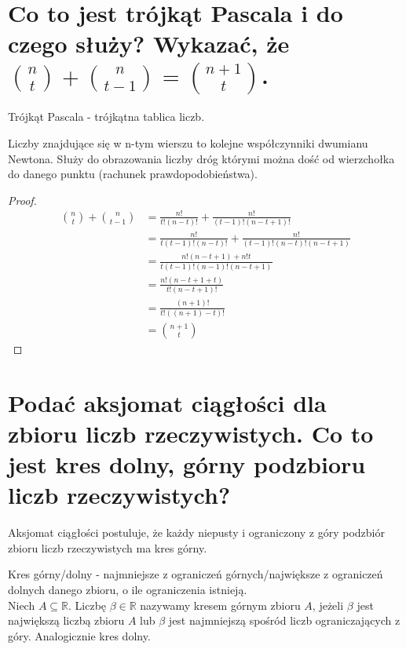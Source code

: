 \documentclass{article}
\numberwithin{equation}{section}
\theoremstyle{definition}
\theoremstyle{case}
\newcommand*{\R}{\mathbb{R}}
\begin{document}
\section{Co to jest trójkąt Pascala i do czego służy? Wykazać, że
	\texorpdfstring
	{${\binom{n}{t}+\binom{n}{t-1}=\binom{n+1}{t}}$.}
	{(n t)+(n t-1)=(n+1 t).}
}
\begin{multicols}{2}
	\raggedcolumns
	Trójkąt Pascala - trójkątna tablica liczb.

	Liczby znajdujące się w n-tym wierszu to kolejne współczynniki dwumianu Newtona. Służy do obrazowania liczby dróg którymi można dość od wierzchołka do danego punktu (rachunek prawdopodobieństwa).

	\centering
\end{multicols}
\begin{proof}
	\begin{align*}
		\binom{n}{t}+\binom{n}{t-1}
		&= \frac{n!}{t!(n-t)!}+\frac{n!}{(t-1)!(n-t+1)!}
		\\ &= \frac{n!}{t(t-1)!(n-t)!}+\frac{n!}{(t-1)!(n-t)!(n-t+1)}
		\\ &= \frac{n!(n-t+1)+n!t}{t(t-1)!(n-1)!(n-t+1)}
		\\ &= \frac{n!(n-t+1+t)}{t!(n-t+1)!}
		\\ &= \frac{(n+1)!}{t!((n+1)-t)!}
		\\ &= \binom{n+1}{t}
	\end{align*}
\end{proof}

\section{Podać aksjomat ciągłości dla zbioru liczb rzeczywistych. Co to jest kres dolny, górny podzbioru liczb rzeczywistych?}
Aksjomat ciągłości postuluje, że każdy niepusty i ograniczony z góry podzbiór zbioru liczb rzeczywistych ma kres górny.

Kres górny/dolny - najmniejsze z ograniczeń górnych/największe z ograniczeń dolnych danego zbioru, o ile ograniczenia istnieją.
\\Niech $A \subseteq \R$. Liczbę $\beta \in \R$ nazywamy kresem górnym zbioru $A$, jeżeli $\beta$ jest największą liczbą zbioru $A$ lub $\beta$ jest najmniejszą spośród liczb ograniczających z góry. Analogicznie kres dolny.
\end{document}
